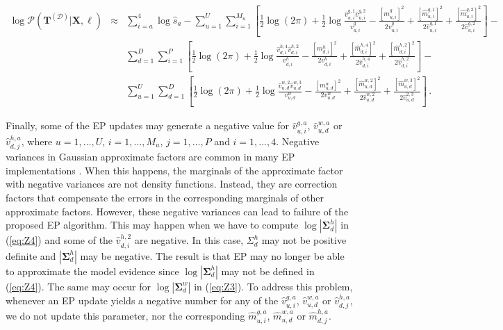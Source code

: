 \documentclass{article}
\begin{document}
\begin{eqnarray}
\log \mathcal{P}(\mathbf{T}^{(\mathcal{D})}|\mathbf{X},\ell) & \approx & \sum_{i=a}^{4}\log\hat{s}_{a}-
\sum_{u=1}^{U}\sum_{i=1}^{M_u}\left[\frac{1}{2}\log(2\pi)+\frac{1}{2}\log \frac{\hat{v}_{u,i}^{g,1} \hat{v}_{u,i}^{g,2}}{v_{u,i}^g}-
\frac{[m_{u,i}^g]^2}{2v_{u,i}^g}+\frac{[\hat{m}_{u,i}^{g,1}]^2}{2\hat{v}_{u,i}^{g,1}}+
\frac{[\hat{m}_{u,i}^{g,2}]^2}{2\hat{v}_{u,i}^{g,2}}\right]-\nonumber\\
& & \sum_{d=1}^{D}\sum_{i=1}^{P}\left[
\frac{1}{2}\log(2\pi)+\frac{1}{2}\log \frac{\hat{v}_{d,i}^{h,4} \hat{v}_{d,i}^{h,2}}{v_{d,i}^h}-
\frac{[m_{d,i}^h]^2}{2v_{d,i}^h}+\frac{[\hat{m}_{d,i}^{h,4}]^2}{2\hat{v}_{d,i}^{h,4}}+
\frac{[\hat{m}_{d,i}^{h,2}]^2}{2\hat{v}_{d,i}^{h,2}}\right]-\nonumber\\
& & \sum_{u=1}^{U}\sum_{d=1}^{D}\left[\frac{1}{2}\log(2\pi)+
\frac{1}{2}\log \frac{\hat{v}_{u,d}^{w,2}\hat{v}_{u,d}^{w,3}}{v_{u,d}^w}-
\frac{[m_{u,d}^w]^2}{2v_{u,d}^w}+\frac{[\hat{m}_{u,d}^{w,2}]^2}{2\hat{v}_{u,d}^{w,2}}+
\frac{[\hat{m}_{u,d}^{w,3}]^2}{2\hat{v}_{u,d}^{2,3}}\right]\,.\label{eq:EPevidenceApprox}
\end{eqnarray}

Finally, some of the EP updates may generate a negative value for $\hat{v}_{u,i}^{g,a}$, 
$\hat{v}_{u,d}^{w,a}$ or $\hat{v}_{d,j}^{h,a}$, where $u = 1,\ldots,U$, $i = 1,\ldots,M_u$, $j = 1,\ldots,P$ and $i = 1,\ldots,4$.
Negative variances in Gaussian approximate factors 
are common in many EP implementations \citep{Minka2001,Minka2002}.
When this happens, the marginals of the approximate factor with negative 
variances are not density functions. Instead, they
are correction factors that compensate the errors in the corresponding marginals of other approximate factors.
However, these negative variances can lead to failure of the proposed EP algorithm.
This may happen when we have to compute $\log|\bm \Sigma_d^h|$ in (\ref{eq:Z4}) and some
of the $\hat{v}_{d,i}^{h,2}$ are negative. In this case, $\Sigma_d^h$ may not be
positive definite and $|\bm \Sigma_d^h|$ may be negative. The result is that EP may no longer be able to approximate the model evidence
since $\log |\bm \Sigma_d^h|$ may not be defined in (\ref{eq:Z4}).
The same may occur for $\log|\bm \Sigma_d^w|$ in (\ref{eq:Z3}).
To address this problem, whenever an EP update yields a negative number for any of the
$\hat{v}_{u,i}^{g,a}$, $\hat{v}_{u,d}^{w,a}$ or $\hat{v}_{d,j}^{h,a}$, we do not update this parameter, nor the corresponding
$\hat{m}_{u,i}^{g,a}$, $\hat{m}_{u,d}^{w,a}$ or $\hat{m}_{d,j}^{h,a}$.
\end{document}
